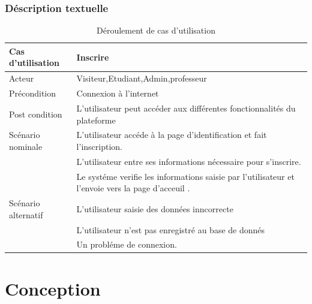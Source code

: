 \subsubsection{Déscription textuelle}  

\begin{table}[h]
    \begin{center} 
    \begin{tabular}{|p{4cm}|p{9cm}|}  \hline 
       Cas d'utilisation& Inscrire \\ \hline
       Acteur&Visiteur,Etudiant,Admin,professeur \\ \hline
       Précondition& Connexion à l'internet   
       \\ \hline
       Post condition& L’utilisateur peut accéder aux différentes fonctionnalités du plateforme
       \\ \hline


       
       Scénario nominale& 
            L'utilisateur accéde à la page d'identification et fait l'inscription.\\
          &L'utilisateur entre ses informations nécessaire pour s'inscrire.\\
          & Le systéme verifie les informations saisie par l'utilisateur et l'envoie vers la page d'acceuil .
                       \\ \hline
                       
       Scénario alternatif&      
        L'utilisateur saisie des données inncorrecte \\
         & L'utilisateur n'est pas enregistré au base de donnés \\
         & Un probléme de connexion.
          
     \\ \hline
  \end{tabular}
  \caption{Déroulement de cas d'utilisation}
  \end{center}
\label{tab:bert_res}
\end{table}













\section{Conception}
